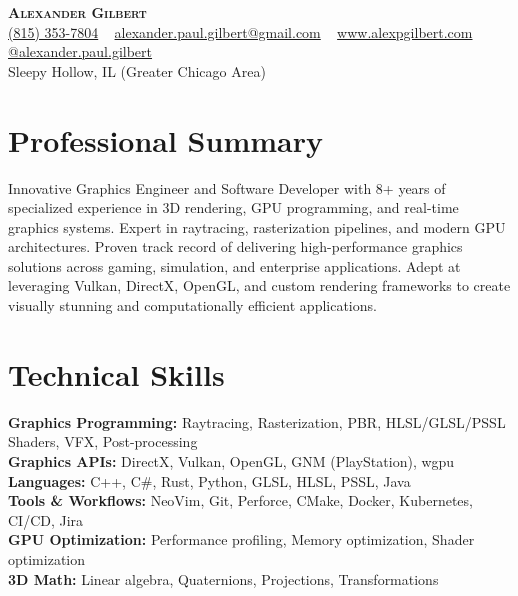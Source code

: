 \documentclass[letterpaper,11pt]{article}
\begin{document}
\begin{center}
    \textbf{\Huge \scshape Alexander Gilbert} \\ \vspace{3pt}
    \small
    \faMobile* \hspace{.5pt} \href{tel:8153537804}{(815) 353-7804} ~
    \faAt \hspace{.5pt} \href{mailto:alexander.paul.gilbert@gmail.com}{alexander.paul.gilbert@gmail.com} ~
    \faGlobe \hspace{.5pt} \href{http://www.alexpgilbert.com}{www.alexpgilbert.com} ~
    \faMedium \hspace{.5pt} \href{https://medium.com/@alexander.paul.gilbert}{@alexander.paul.gilbert} \\
    \faMapMarker* \hspace{.5pt} Sleepy Hollow, IL (Greater Chicago Area)
\end{center}

\section{Professional Summary}
\small{
Innovative Graphics Engineer and Software Developer with 8+ years of specialized experience in 3D rendering, GPU programming, and real-time graphics systems. Expert in raytracing, rasterization pipelines, and modern GPU architectures. Proven track record of delivering high-performance graphics solutions across gaming, simulation, and enterprise applications. Adept at leveraging Vulkan, DirectX, OpenGL, and custom rendering frameworks to create visually stunning and computationally efficient applications.
}

\section{Technical Skills}
\begin{itemize}[leftmargin=0.15in, label={}]
    \small{\item{
    \textbf{Graphics Programming:} Raytracing, Rasterization, PBR, HLSL/GLSL/PSSL Shaders, VFX, Post-processing \\
    \textbf{Graphics APIs:} DirectX, Vulkan, OpenGL, GNM (PlayStation), wgpu \\
    \textbf{Languages:} C++, C\#, Rust, Python, GLSL, HLSL, PSSL, Java \\
    \textbf{Tools \& Workflows:} NeoVim, Git, Perforce, CMake, Docker, Kubernetes, CI/CD, Jira \\
    \textbf{GPU Optimization:} Performance profiling, Memory optimization, Shader optimization \\
    \textbf{3D Math:} Linear algebra, Quaternions, Projections, Transformations
    }}
\end{itemize}
\end{document}
